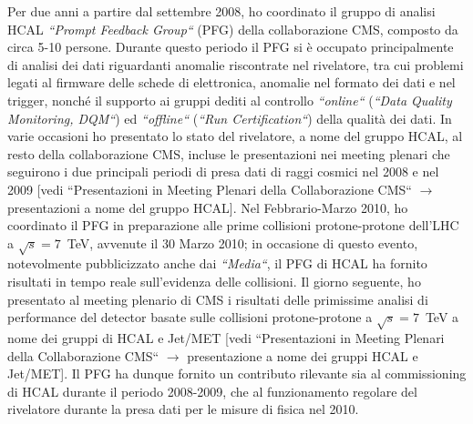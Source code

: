 \documentclass[10pt, a4paper]{article}
\begin{document}
Per due anni a partire dal settembre 2008, ho coordinato il gruppo di analisi 
HCAL {\it ``Prompt Feedback Group``} (PFG) della collaborazione CMS, composto da circa 5-10 persone. 
Durante questo periodo il PFG si \`e occupato principalmente di analisi dei dati riguardanti anomalie 
riscontrate nel rivelatore, tra cui problemi legati al firmware 
delle schede di elettronica, anomalie nel formato dei dati e nel trigger, nonch\'e il supporto ai gruppi dediti al 
controllo {\it ``online``} ({\it ``Data Quality Monitoring, DQM``}) ed {\it ``offline``} 
({\it ``Run Certification``}) della qualit\`a dei dati.
In varie occasioni ho presentato lo stato del rivelatore, a nome del gruppo HCAL, al resto della collaborazione CMS, 
incluse le presentazioni nei meeting plenari che seguirono i due principali periodi di presa dati di raggi cosmici 
nel 2008 e nel 2009 [vedi ``Presentazioni in Meeting Plenari della Collaborazione CMS`` $\rightarrow$  
presentazioni a nome del gruppo HCAL]. Nel Febbrario-Marzo 2010, ho coordinato il PFG in preparazione alle 
prime collisioni protone-protone dell'LHC a $\sqrt{s}=7$~TeV, avvenute il 30 Marzo 2010; in occasione di questo evento, 
notevolmente pubblicizzato anche dai {\it ``Media``}, il PFG di HCAL ha fornito risultati in tempo reale 
sull'evidenza delle collisioni. Il giorno seguente, ho presentato al meeting plenario di CMS i risultati delle 
primissime analisi di performance del detector basate sulle collisioni protone-protone a $\sqrt{s}=7$~TeV a nome dei gruppi di HCAL e Jet/MET 
[vedi ``Presentazioni in Meeting Plenari della Collaborazione CMS`` $\rightarrow$ presentazione 
a nome dei gruppi HCAL e Jet/MET]. Il PFG ha dunque fornito un contributo rilevante sia al commissioning 
di HCAL durante il periodo 2008-2009, che al funzionamento regolare del rivelatore durante la presa dati 
per le misure di fisica nel 2010. \\
\end{document}
